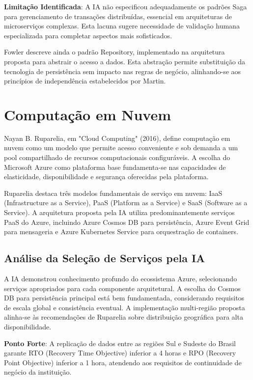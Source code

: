 \textbf{Limitação Identificada}: A IA não especificou adequadamente os padrões Saga para gerenciamento de transações distribuídas, essencial em arquiteturas de microserviços complexas. Esta lacuna sugere necessidade de validação humana especializada para completar aspectos mais sofisticados.

Fowler descreve ainda o padrão Repository, implementado na arquitetura proposta para abstrair o acesso a dados. Esta abstração permite substituição da tecnologia de persistência sem impacto nas regras de negócio, alinhando-se aos princípios de independência estabelecidos por Martin.

\section{Computação em Nuvem}

Nayan B. Ruparelia, em "Cloud Computing" (2016), define computação em nuvem como um modelo que permite acesso conveniente e sob demanda a um pool compartilhado de recursos computacionais configuráveis. A escolha do Microsoft Azure como plataforma base fundamenta-se nas capacidades de elasticidade, disponibilidade e segurança oferecidas pela plataforma.

Ruparelia destaca três modelos fundamentais de serviço em nuvem: IaaS (Infrastructure as a Service), PaaS (Platform as a Service) e SaaS (Software as a Service). A arquitetura proposta pela IA utiliza predominantemente serviços PaaS do Azure, incluindo Azure Cosmos DB para persistência, Azure Event Grid para mensageria e Azure Kubernetes Service para orquestração de containers.

\subsection{Análise da Seleção de Serviços pela IA}

A IA demonstrou conhecimento profundo do ecossistema Azure, selecionando serviços apropriados para cada componente arquitetural. A escolha do Cosmos DB para persistência principal está bem fundamentada, considerando requisitos de escala global e consistência eventual. A implementação multi-região proposta alinha-se às recomendações de Ruparelia sobre distribuição geográfica para alta disponibilidade.

\textbf{Ponto Forte}: A replicação de dados entre as regiões Sul e Sudeste do Brasil garante RTO (Recovery Time Objective) inferior a 4 horas e RPO (Recovery Point Objective) inferior a 1 hora, atendendo aos requisitos de continuidade de negócio da instituição.

